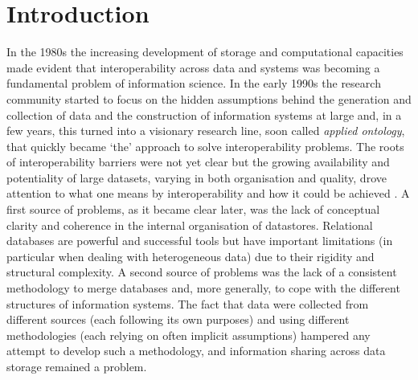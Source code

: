 \documentclass[ao]{iosart2x}
\newcommand{\nb}[1]{\textcolor{red}{$|$}\marginpar{\hspace*{-0cm}\parbox{20mm}{\scriptsize\raggedright\textcolor{red}{#1}}}}
\begin{document}




\section{Introduction}\label{sect_intro}



In the 1980s the increasing development of storage and computational capacities made evident that interoperability across data and systems was becoming a fundamental problem of information science. In the early 1990s the research community started to focus on the hidden assumptions behind the generation and collection of data and the construction of information systems at large and, in a few years, this turned into a visionary research line, soon called {\em applied ontology}, that quickly became `the' approach to solve interoperability problems. 
The roots of interoperability barriers were not yet clear but the growing availability and potentiality of large datasets, varying in both organisation and quality, drove attention to what one means by interoperability and how it could be achieved \citep{oukselSemanticInteroperability1999,gardner2005ontologies}. %
A first source of problems, as it became clear later, was the lack of conceptual clarity and coherence in the internal organisation of datastores. Relational databases are powerful and successful tools but have important limitations (in particular when dealing with heterogeneous data) due to their rigidity and structural complexity. %
A second source of problems was the lack of a consistent methodology to merge databases and, more generally, to cope with the different structures of information systems. The fact that data were collected from different sources (each following its own purposes) and using different methodologies (each relying on often implicit assumptions) hampered any attempt to develop such a methodology, and information sharing across data storage remained a problem.
\end{document}
